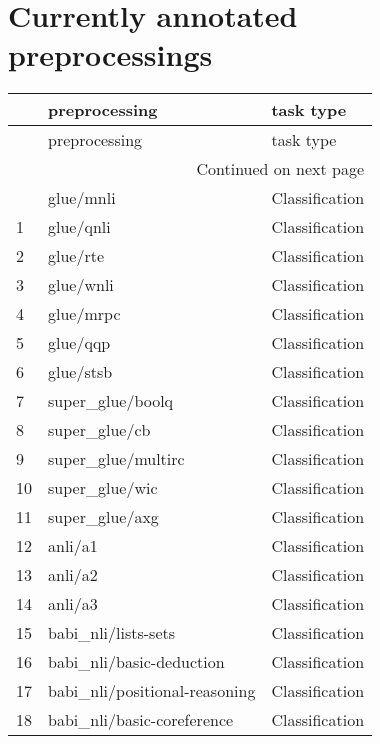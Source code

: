 \documentclass[11pt]{article}
\begin{document}
\section{Currently annotated preprocessings \label{sec:appendix}}
\begin{longtable}{lll}
\toprule
{} & preprocessing & task type \\
\midrule
\endfirsthead

\toprule
{} & preprocessing & task type \\
\midrule
\endhead
\midrule
\multicolumn{3}{r}{{Continued on next page}} \\
\midrule
\endfoot

\bottomrule
\endlastfoot
0 & glue/mnli \citep{N18-1101} & Classification \\
1 & glue/qnli \citep{N18-1101} & Classification \\
2 & glue/rte \citep{N18-1101} & Classification \\
3 & glue/wnli \citep{N18-1101} & Classification \\
4 & glue/mrpc \citep{N18-1101} & Classification \\
5 & glue/qqp \citep{N18-1101} & Classification \\
6 & glue/stsb \citep{N18-1101} & Classification \\
7 & super\_glue/boolq \citep{clark2019boolq} & Classification \\
8 & super\_glue/cb \citep{demarneff_simons_tonhauser_2019} & Classification \\
9 & super\_glue/multirc \citep{MultiRC2018} & Classification \\
10 & super\_glue/wic \citep{DBLP:journals/corr/abs-1808-09121} & Classification \\
11 & super\_glue/axg \citep{rudinger-EtAl:2018:N18} & Classification \\
12 & anli/a1 \citep{nie2019adversarial} & Classification \\
13 & anli/a2 \citep{nie2019adversarial} & Classification \\
14 & anli/a3 \citep{nie2019adversarial} & Classification \\
15 & babi\_nli/lists-sets \citep{weston2015towards} & Classification \\
16 & babi\_nli/basic-deduction \citep{weston2015towards} & Classification \\
17 & babi\_nli/positional-reasoning \citep{weston2015towards} & Classification \\
18 & babi\_nli/basic-coreference \citep{weston2015towards} & Classification \\

\end{longtable}
\end{document}
